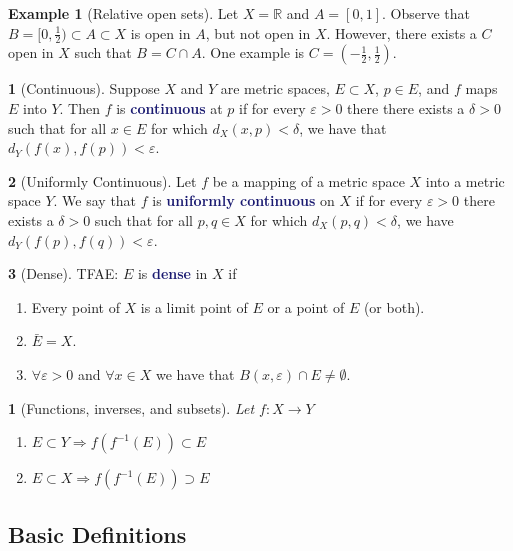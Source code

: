 \documentclass[11pt]{article}
\numberwithin{equation}{section}
\newcommand{\navy}[1]{\textcolor{MidnightBlue}{\bf #1}}
\theoremstyle{plain}
\newtheorem{theorem}{\color{ForestGreen}{\textbf{Theorem}}}[section]
\theoremstyle{definition}
\newtheorem{definition}{\color{MidnightBlue}{\textbf{Definition}}}[section]
\newtheorem{example}{\color{WildStrawberry}Example}[section]
\newcommand\inv[1]{#1^{-1}}
\def\imp{\Rightarrow}
\newcommand{\1}{\mathbbm 1}
\def\d{\delta}
\newcommand{\e}{\varepsilon}
\newcommand{\RR}{\mathbb R}
\begin{document}
\begin{example}[Relative open sets]
	Let $X = \RR$ and $A = [0,1]$. Observe that $B = [0,\frac{1}{2}) \subset A \subset X$ is open in $A$, but not open in $X$. However, there exists a $C$ open in $X$ such that $B = C \cap A$. One example is $C = (-\frac{1}{2}, \frac{1}{2})$.
\end{example}	


\begin{definition}[Continuous]
	Suppose $X$ and $Y$ are metric spaces, $E \subset X$, $p \in E$, and $f$ maps $E$ into $Y$. Then $f$ is \navy{continuous} at $p$ if for every $\e > 0$ there there exists a $\d > 0$ such that for all $x \in E$ for which $d_X(x,p) < \d$, we have that $d_Y(f(x), f(p)) < \e$. 
\end{definition}

\begin{definition}[Uniformly Continuous]
	Let $f$ be a mapping of a metric space $X$ into a metric space $Y$. We say that $f$ is \navy{uniformly continuous} on $X$ if for every $\e > 0$ there exists a $\d > 0$ such that for all $p,q \in X$ for which $d_X(p,q) < \delta$, we have $d_Y(f(p),f(q)) < \e$. 
\end{definition}

\begin{definition}[Dense] TFAE: $E$ is \navy{dense} in $X$ if
\begin{enumerate}
	\item  Every point of $X$ is a limit point of $E$ or a point of $E$ (or both). 
	\item $\bar{E} = X$.
	\item $\forall \e > 0$ and $\forall x \in X$ we have that $B(x,\e) \cap E \neq \emptyset$.
\end{enumerate} 
\end{definition}

\begin{theorem}[Functions, inverses, and subsets]
	Let $f: X \to Y$
	\begin{enumerate}
		\item $E \subset Y \imp f(\inv{f}(E)) \subset E$ 
		\item $E \subset X \imp f(\inv{f}(E)) \supset E$
	\end{enumerate}
\end{theorem}



\subsection{Basic Definitions}
\end{document}

